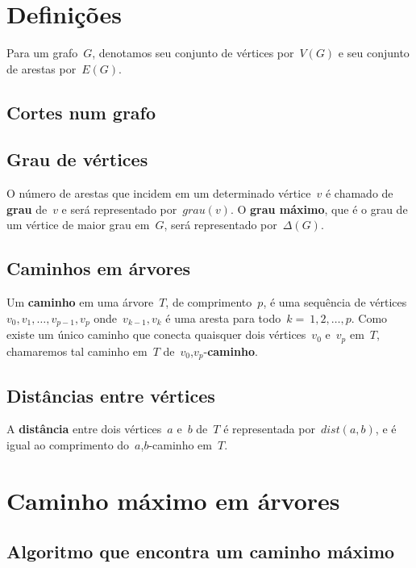 \documentclass[a4paper,12pt]{article}
\begin{document}
\section{Definições}
	Para um grafo~$G$, denotamos seu
	conjunto de vértices por~$V(G)$ e seu
	conjunto de arestas por~$E(G)$.

	\subsection{Cortes num grafo}
	

	\subsection{Grau de vértices}
	O número de arestas que incidem em um determinado
	vértice~$v$ é chamado de 
	\textbf{grau} de~$v$ e será representado
	por~$grau(v)$. O 
	\textbf{grau máximo}, que é o grau de um vértice de
	maior grau em~$G$, será representado por~$\Delta(G)$.

	\subsection{Caminhos em árvores}
	Um \textbf{caminho} em uma árvore~$T$, de 
	comprimento~$p$, é uma sequência de 
	vértices~$v_0, v_1, \ldots,v_{p-1}, v_p$ 
	onde~$v_{k-1}, v_k$ é uma aresta para todo~$k =~1,2, \ldots, p$. 
	Como existe um único caminho que conecta quaisquer dois 
	vértices~$v_0$ e~$v_p$ em~$T$, chamaremos tal 
	caminho em~$T$ de~$v_0$,$v_p$-\textbf{caminho}.

	\subsection{Distâncias entre vértices}
	A \textbf{distância} entre dois vértices~$a$ e~$b$ 
	de~$T$ é representada por~$dist(a,b)$, 
	e é igual ao comprimento do~$a$,$b$-caminho em~$T$.

		

\newpage



\section{Caminho máximo em árvores}\label{sec:caminhoMaximo}
	\subsection{Algoritmo que encontra um caminho máximo}
\end{document}
